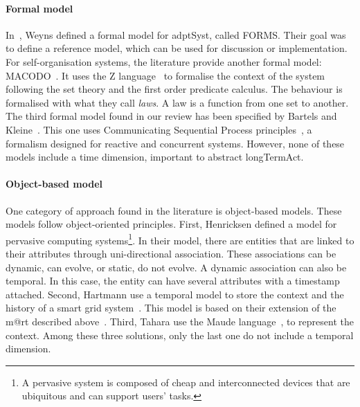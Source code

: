 \paragraph{Formal model}
In~\cite{DBLP:journals/taas/WeynsMA12}, Weyns \etal defined a formal model for \gls{adptSyst}, called FORMS.
Their goal was to define a reference model, which can be used for discussion or implementation.
For self-organisation systems, the literature provide another formal model: MACODO~\cite{DBLP:journals/taas/WeynsHH10}.
It uses the Z language~\cite{DBLP:books/daglib/0011651} to formalise the context of the system following the set theory and the first order predicate calculus.
The \gls{behaviour} is formalised with what they call \textit{laws}.
A law is a function from one set to another.
The third formal model found in our review has been specified by Bartels and Kleine~\cite{DBLP:conf/icse/BartelsK11}.
This one uses Communicating Sequential Process principles~\cite{DBLP:journals/cacm/Hoare78}, a formalism designed for reactive and concurrent systems.
However, none of these models include a time dimension, important to abstract \gls{longTermAct}.

\paragraph{Object-based model}
One category of approach found in the literature is object-based models.
These models follow object-oriented principles.
First, Henricksen \etal defined a model for pervasive computing systems\footnote{A pervasive system is composed of cheap and interconnected devices that are ubiquitous and can support users' tasks.\cite{DBLP:conf/pervasive/HenricksenIR02}}.
In their model, there are entities that are linked to their attributes through uni-directional association.
These associations can be dynamic, can evolve, or static, do not evolve.
A dynamic association can also be temporal.
In this case, the entity can have several attributes with a timestamp attached.
Second, Hartmann \etal use a temporal model to store the context and the history of a smart grid system~\cite{DBLP:conf/smartgridsec/0001FKNT14}.
This model is based on their extension of the \gls{m@rt} described above~\cite{DBLP:conf/seke/0001FNMKT14, DBLP:conf/models/0001FNMKBT14}.
Third, Tahara \etal \cite{DBLP:conf/icse/TaharaOH17} use the Maude language~\cite{DBLP:journals/tcs/ClavelDELMMQ02}, to represent the context. 
Among these three solutions, only the last one do not include a temporal dimension.

